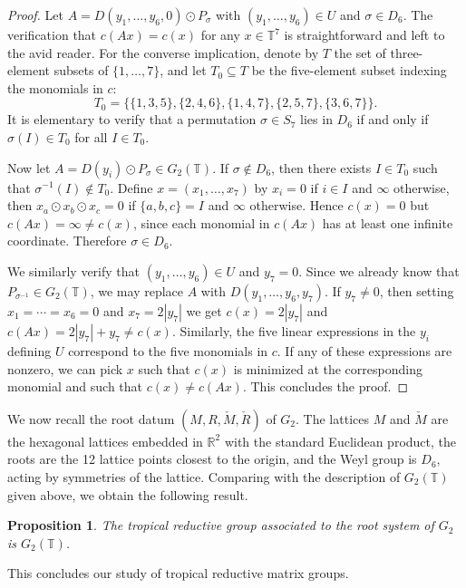 \documentclass[10pt, a4paper]{amsart}
\newtheorem{proposition}[theorem]{Proposition}
\theoremstyle{definition}
\theoremstyle{myitemstyle}
\newcommand{\RR}{\mathbb{R}}
\newcommand{\TT}{\mathbb{T}}
\newcommand{\Mcheck}{{\check{M}}}
\newcommand{\Rcheck}{\check{R}}
\begin{document}
\begin{proof} Let $A=D(y_1,\ldots,y_6,0)\odot P_{\sigma}$ with $(y_1,\ldots,y_6)\in U$ and $\sigma \in D_6$. The verification that $c(Ax)=c(x)$ for any $x\in \TT^7$ is straightforward and left to the avid reader. For the converse implication, denote by $T$ the set of three-element subsets of $\{1,\ldots,7\}$, and let $T_0\subseteq T$ be the five-element subset indexing the monomials in $c$:
\[
T_0=\big\{\{1,3,5\},\{2,4,6\},\{1,4,7\},\{2,5,7\},\{3,6,7\}\big\}.
\]
It is elementary to verify that a permutation $\sigma\in S_7$ lies in $D_6$ if and only if $\sigma(I)\in T_0$ for all $I\in T_0$.


Now let $A=D(y_i)\odot P_{\sigma}\in G_2(\TT)$. If $\sigma\notin D_6$, then there exists $I\in T_0$ such that $\sigma^{-1} (I)\notin T_0$. Define $x=(x_1,\ldots,x_7)$ by $x_i=0$ if $i\in I$ and $\infty$ otherwise, then $x_a\odot x_b\odot x_c=0$ if $\{a,b,c\}=I$ and $\infty$ otherwise. Hence $c(x)=0$ but $c(Ax)=\infty\neq c(x)$, since each monomial in $c(Ax)$ has at least one infinite coordinate. Therefore $\sigma\in D_6$.

We similarly verify that $(y_1,\ldots,y_6)\in U$ and $y_7=0$. Since we already know that $P_{\sigma^{-1}}\in G_2(\TT)$, we may replace $A$ with $D(y_1,\ldots,y_6,y_7)$. If $y_7\neq 0$, then setting $x_1=\cdots=x_6=0$ and $x_7=2|y_7|$ we get $c(x)=2|y_7|$ and $c(Ax)=2|y_7|+y_7\neq c(x)$. Similarly, the five linear expressions in the $y_i$ defining $U$ correspond to the five monomials in $c$. If any of these expressions are nonzero, we can pick $x$ such that $c(x)$ is minimized at the corresponding monomial and such that $c(x)\neq c(Ax)$. This concludes the proof.



\end{proof}

We now recall the root datum $(M,R,\Mcheck,\Rcheck)$ of $G_2$. The lattices $M$ and $\Mcheck$ are the hexagonal lattices embedded in $\RR^2$ with the standard Euclidean product, the roots are the 12 lattice points closest to the origin, and the Weyl group is $D_6$, acting by symmetries of the lattice. Comparing with the description of $G_2(\TT)$ given above, we obtain the following result.

\begin{proposition} The tropical reductive group associated to the root system of $G_2$ is $G_2(\TT)$. \label{prop:tropicalG2}
\end{proposition}

This concludes our study of tropical reductive matrix groups. 
\end{document}
